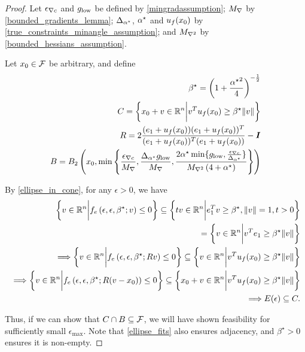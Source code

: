 \begin{proof}

Let ${\epsilon_{\nabla c}}$ and ${ g_{\textrm{low}} }$ be defined by \cref{mingradassumption};
${M_{\nabla}}$ by \cref{bounded_gradients_lemma};
${\Delta_{\alpha^{\star}}}$, ${ \alpha^{\star} }$ and ${u_{f}(x_0)}$ by \cref{true_constraints_minangle_assumption};
and ${M_{\nabla^2}}$ by \cref{bounded_hessians_assumption}.

Let $x_0 \in {\mathcal F}$ be arbitrary, and define
\begin{align*}
\beta^{\star} = \left(1 + \frac {{ \alpha^{\star} }^2} 4\right)^{-\frac 1 2} \\
C = \left\{x_0 + v \in \mathbb R^n \bigg | v^T{u_{f}(x_0)} \ge \beta^{\star} \|v\| \right\} \\
R = 2\frac{(e_1 + {u_{f}(x_0)})(e_1 + {u_{f}(x_0)})^T}{(e_1 + {u_{f}(x_0)})^T(e_1 + {u_{f}(x_0)})} - \boldsymbol I \\
B = B_2\left(x_0, \min\left\{
\frac {{\epsilon_{\nabla c}}} {{M_{\nabla}}}, \frac{{\Delta_{\alpha^{\star}}} { g_{\textrm{low}} }}{{M_{\nabla}}},
 \frac {2{ \alpha^{\star} }  \min\{{ g_{\textrm{low}} }, \frac{{\epsilon_{\nabla c}}}{{\Delta_{\alpha^{\star}}}}\}}{{M_{\nabla^2}}\left(4 + { \alpha^{\star} }\right)}
\right\}\right)
\end{align*}

By \cref{ellipse_in_cone}, for any $\epsilon > 0$, we have
\begin{align*}
\left\{v \in \mathbb R^n \bigg| f_e\left(\epsilon, \epsilon, \beta^{\star}; v\right) \le 0\right\}
\subseteq \left\{tv\in\mathbb R^n\bigg| e_1^T v \ge \beta^{\star},\|v\|=1, t>0\right\} \\
\
=
\left\{v\in\mathbb R^n\bigg| v^Te_1 \ge \beta^{\star}\|v\|\right\} \\
\
\Longrightarrow \left\{v \in \mathbb R^n \bigg| f_e\left(\epsilon, \epsilon, \beta^{\star}; Rv\right) \le 0\right\}
\subseteq \left\{v\in\mathbb R^n\bigg| v^T{u_{f}(x_0)} \ge \beta^{\star}\|v\|\right\} \\
\
\Longrightarrow \left\{v \in \mathbb R^n \bigg| f_e\left(\epsilon, \epsilon, \beta^{\star}; R(v - x_0)\right) \le 0\right\}
\subseteq \left\{x_0+ v\in\mathbb R^n\bigg| v^T{u_{f}(x_0)} \ge \beta^{\star}\|v\|\right\} \\
\Longrightarrow E(\epsilon) \subseteq C.
\end{align*}

Thus, if we can show that $C \cap B \subseteq {\mathcal F}$, we will have shown feasibility for sufficiently small $\epsilon_{\textrm{max}}$.
Note that \cref{ellipse_fits} also ensures adjacency, and $\beta^{\star} > 0$ ensures it is non-empty.


\end{proof}
